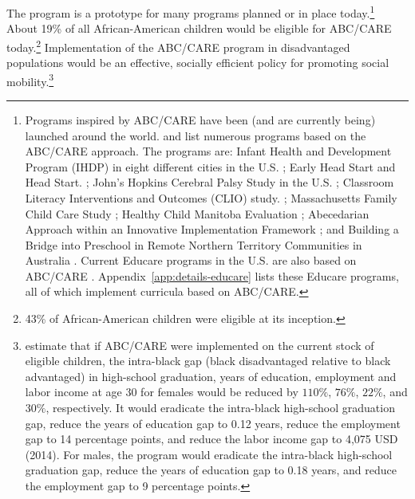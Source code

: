 The program is a prototype for many programs planned or in place today.\footnote{Programs inspired by ABC/CARE have been (and are currently being) launched around the world. \citet{Sparling_2010_Highlights} and \citet{Ramey_Ramey_Lanzi_2014_Interventions} list numerous programs based on the ABC/CARE approach. The programs are: Infant Health and Development Program (IHDP) in eight different cities in the U.S. \citep{Spiker-etal_1997_Helping}; Early Head Start and Head Start. \citep{Schneider_McDonald-eds_2007_Scale-Up_Vol-1}; John's Hopkins Cerebral Palsy Study in the U.S. \citep{Sparling_2010_Highlights}; Classroom Literacy Interventions and Outcomes (CLIO) study. \citep{Sparling_2010_Highlights}; Massachusetts Family Child Care Study \citep{Collins_etal_2010_Massachusetts-Study}; Healthy Child Manitoba Evaluation \citep{Healthy_Child_Manitoba_2015_Starting-Early}; Abecedarian Approach within an Innovative Implementation Framework \citep{Jensen_Nielsen_2016_ABC-Programme-Pilot}; and Building a Bridge into Preschool in Remote Northern Territory Communities in Australia \citep{UMonash_Dataset_2015_URL}. Current Educare programs in the U.S. are also based on ABC/CARE \citep{Educare_2014_Research_Agenda,Yazejian_Bryant_2012_Educare}. Appendix~\ref{app:details-educare} lists these Educare programs, all of which implement curricula based on ABC/CARE.} About 19\% of all African-American children would be eligible for ABC/CARE today.\footnote{43\% of African-American children were eligible at its inception.} Implementation of the ABC/CARE program in disadvantaged populations would be an effective, socially efficient policy for promoting social mobility.\footnote{\citet{Garcia_2016_National-Implementation-ECI} estimate that if ABC/CARE were implemented on the current stock of eligible children, the intra-black gap (black disadvantaged relative to black advantaged) in high-school graduation, years of education, employment and labor income at age 30 for females would be reduced by $110\%$, $76\%$, $22\%$, and $30\%$, respectively. It would eradicate the intra-black high-school graduation gap, reduce the years of education gap to 0.12 years, reduce the employment gap to 14 percentage points, and reduce the labor income gap to 4,075 USD (2014). For males, the program would eradicate the intra-black high-school graduation gap, reduce the years of education gap to 0.18 years, and reduce the employment gap to 9 percentage points.}

